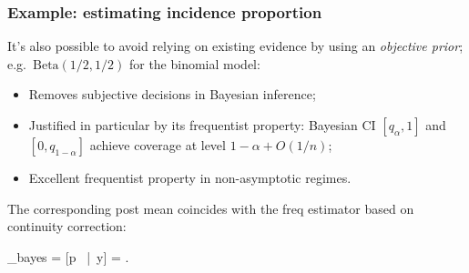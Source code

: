 \documentclass[18pt, handout]{beamer}
\newcommand{\defineTightItemizeSpacing}{%
	\setlength{\abovedisplayskip}{.25\baselineskip}%
	\setlength{\belowdisplayskip}{.25\baselineskip}%
}
\newenvironment{tightEquation*}{%
	\defineTightItemizeSpacing%
	\begin{equation*}
}{
	\end{equation*} \ignorespacesafterend
}
\newenvironment{narrowItemize}[1][]{%
  \vspace{-.3\baselineskip}%
  \begin{itemize}[#1]
  \addtolength\itemsep{-.1\baselineskip}
}{
  \end{itemize}
}
\newcommand{\given}{\, | \,}
\newcommand{\expectation}{\mathbb{E}}
\newcommand{\betaDist}{\mathrm{Beta}}
\begin{document}
\begin{frame}
\frametitle{Example: estimating incidence proportion}

It's also possible to avoid relying on existing evidence by using an \textit{objective prior};
e.g.\ $\betaDist(1/2, 1/2)$ for the binomial model:%

\pause%
\begin{narrowItemize}
\item Removes subjective decisions in Bayesian inference; 
\pause
\item Justified in particular by its frequentist property: Bayesian CI $[q_{\alpha}, 1]$ and $[0, q_{1 - \alpha}]$ achieve coverage at level $1 - \alpha + O(1/n)$;
\pause
\item Excellent frequentist property in non-asymptotic regimes.
\end{narrowItemize}

\pause
The corresponding post mean coincides with the freq estimator based on continuity correction:
\begin{tightEquation*}
_{\textrm{bayes}} 
	= \expectation[p \given y] 
	= .
\end{tightEquation*}
\end{frame}
\end{document}
